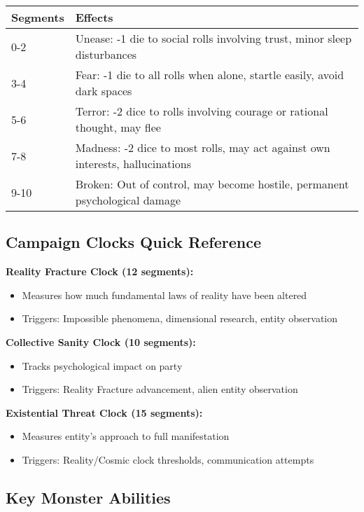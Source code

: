 \documentclass[11pt]{article}
\begin{document}
\begin{tabular}{|p{2cm}|p{10cm}|}
\hline
\rowcolor{shadecolor}
\textbf{Segments} & \textbf{Effects} \\
\hline
0-2 & Unease: -1 die to social rolls involving trust, minor sleep disturbances \\
3-4 & Fear: -1 die to all rolls when alone, startle easily, avoid dark spaces \\
5-6 & Terror: -2 dice to rolls involving courage or rational thought, may flee \\
7-8 & Madness: -2 dice to most rolls, may act against own interests, hallucinations \\
9-10 & Broken: Out of control, may become hostile, permanent psychological damage \\
\hline
\end{tabular}

\subsection*{Campaign Clocks Quick Reference}

\textbf{Reality Fracture Clock (12 segments):}
\begin{itemize}
\item Measures how much fundamental laws of reality have been altered
\item Triggers: Impossible phenomena, dimensional research, entity observation
\end{itemize}

\textbf{Collective Sanity Clock (10 segments):}
\begin{itemize}
\item Tracks psychological impact on party
\item Triggers: Reality Fracture advancement, alien entity observation
\end{itemize}

\textbf{Existential Threat Clock (15 segments):}
\begin{itemize}
\item Measures entity's approach to full manifestation
\item Triggers: Reality/Cosmic clock thresholds, communication attempts
\end{itemize}

\subsection*{Key Monster Abilities}
\end{document}

